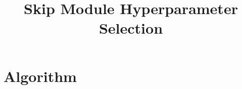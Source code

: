 \documentclass{article}
\title{Skip Module Hyperparameter Selection}
\author{}
\date{}
\begin{document}
\maketitle

\section{Algorithm}

% 

% 

% 

%

%

\end{document}
